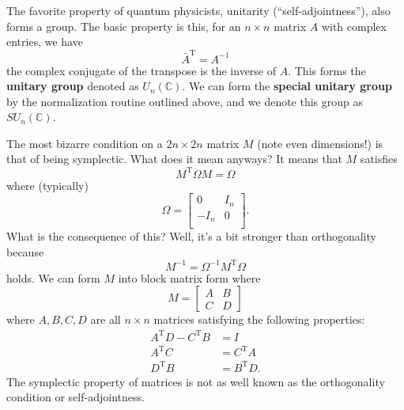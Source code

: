 The favorite property of quantum physicists, unitarity (``self-adjointness''), 
also forms a group. The basic property is this, for an $n\times n$ matrix $A$
with complex entries, we have
\begin{equation}
\bar{A}^\textrm{T} = A^{-1}
\end{equation}
the complex conjugate of the transpose is the inverse of $A$. This forms the
\textbf{unitary group} denoted as $U_{n}(\mathbb{C})$. We can form the 
\textbf{special unitary group} by the normalization routine outlined above, and
we denote this group as $SU_{n}(\mathbb{C})$. 

The most bizarre condition on a $2n\times 2n$ matrix $M$ (note even dimensions!) is that of being symplectic. What does it mean anyways? It means that $M$ satisfies
\begin{equation}
M^\textrm{T} \Omega M = \Omega
\end{equation}
where (typically)
\begin{equation}\label{usualSuspect}
\Omega = \begin{bmatrix} 0 & I_n \\ -I_n & 0 \\ \end{bmatrix}.
\end{equation} 
What is the consequenec of this? Well, it's a bit stronger than orthogonality because
\begin{equation}
M^{-1} = \Omega^{-1}M^\textrm{T}\Omega
\end{equation}
holds. We can form $M$ into block matrix form where
\begin{equation}
M = \begin{bmatrix}A & B \\ C & D\end{bmatrix}
\end{equation}
where $A,B,C,D$ are all $n\times n$ matrices satisfying the following properties:
\begin{subequations}
\begin{align}
A^\textrm{T}D - C^\textrm{T}B &= I \\
A^\textrm{T}C &= C^\textrm{T}A \\
D^\textrm{T}B &= B^\textrm{T}D.
\end{align}
\end{subequations}
The symplectic property of matrices is not as well known as the orthogonality condition or self-adjointness.

